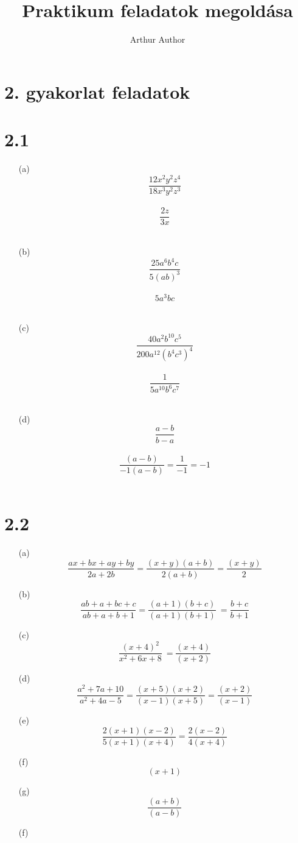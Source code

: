 \documentclass[12pt, a4paper]{article}
\title{Praktikum feladatok megoldása} %
\author{Arthur Author} %
\begin{document}
\maketitle

\section{2. gyakorlat feladatok}
\section{2.1}
\begin{enumerate}
    \item[(a)] 
    \[\frac{12x^2 y^2 z^4}{18x^3 y^2 z^3}\]
    \\
    \[\frac{2z}{3x}\]
    \\
    \item[(b)]
    \[\frac{25a^6b^4c}{5(ab)^3}\]
    \\
    \[5a^3bc\]
    \\
    \item[(c)]
    \[\frac{40a^2b^{10}c^5}{200a^{12}(b^4c^3)^4}\]
    \\
    \[\frac{1}{5a^{10}b^6c^7}\]
    \\
    \item[(d)]
    \[\frac{a-b}{b-a}\]
    \\
    \[\frac{(a-b)}{-1(a-b)} = \frac{1}{-1} = -1\] 
    \\
\end{enumerate}
\section{2.2}
\begin{enumerate}
\item[(a)]
    \[\frac{ax+bx+ay+by}{2a+2b} = \frac{(x+y)(a+b)}{2(a+b)} = \frac{(x+y)}{2}\]
\item[(b)]
    \[\frac{ab+a+bc+c}{ab+a+b+1} = \frac{(a+1)(b+c)}{(a+1)(b+1)}\ = \frac{b+c}{b+1}\]
\item[(c)]
\[\frac{(x + 4)^2}{x^2 + 6x + 8}\ = \frac{(x+4)}{(x+2)}\]
\item[(d)] 
\[ \frac{a^2 + 7a + 10}{a^2 + 4a - 5}  = \frac{(x+5)(x+2)}{(x-1)(x+5)}=\frac{(x+2)}{(x-1)}\]
\item[(e)]
\[\frac{2(x+1)(x-2)}{5(x+1)(x+4)} = \frac{2(x-2)}{4(x+4)}\]
\item[(f)]
\[(x+1)\]
\item[(g)]  
\[\frac{(a+b)}{(a-b)}\]
\item[(f)] 

\end{enumerate}
\end{document}
